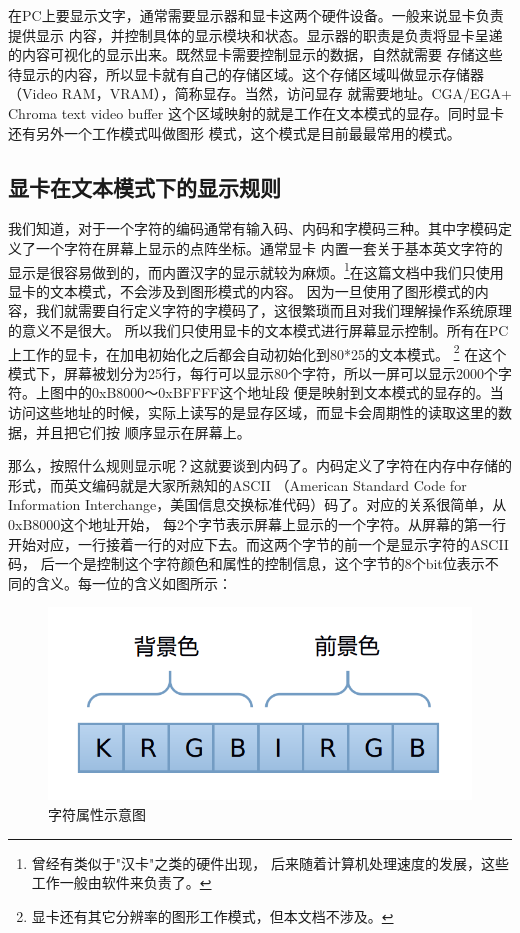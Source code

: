\par 在PC上要显示文字，通常需要显示器和显卡这两个硬件设备。一般来说显卡负责提供显示\allowbreak
内容，并控制具体的显示模块和状态。显示器的职责是负责将显卡呈递的内容可视化的显示出来。既然显卡需要控制显示的数据，自然就需要\allowbreak
存储这些待显示的内容，所以显卡就有自己的存储区域。这个存储区域叫做显示存储器（Video RAM，VRAM），简称显存。当然，访问显存\allowbreak
就需要地址。CGA/EGA+ Chroma text video buffer 这个区域映射的就是工作在文本模式的显存。同时显卡还有另外一个工作模式叫做图形\allowbreak
模式，这个模式是目前最最常用的模式。

\subsection{显卡在文本模式下的显示规则}

\par 我们知道，对于一个字符的编码通常有输入码、内码和字模码三种。其中字模码定义了一个字符在屏幕上显示的点阵坐标。通常显卡\allowbreak
内置一套关于基本英文字符的显示是很容易做到的，而内置汉字的显示就较为麻烦。\footnote{曾经有类似于"汉卡"之类的硬件出现，\allowbreak
后来随着计算机处理速度的发展，这些工作一般由软件来负责了。}在这篇文档中我们只使用显卡的文本模式，不会涉及到图形模式的内容。\allowbreak
因为一旦使用了图形模式的内容，我们就需要自行定义字符的字模码了，这很繁琐而且对我们理解操作系统原理的意义不是很大。\allowbreak
所以我们只使用显卡的文本模式进行屏幕显示控制。所有在PC上工作的显卡，在加电初始化之后都会自动初始化到80*25的文本模式。\allowbreak
\footnote{显卡还有其它分辨率的图形工作模式，但本文档不涉及。}\allowbreak
在这个模式下，屏幕被划分为25行，每行可以显示80个字符，所以一屏可以显示2000个字符。上图中的0xB8000～0xBFFFF这个地址段\allowbreak
便是映射到文本模式的显存的。当访问这些地址的时候，实际上读写的是显存区域，而显卡会周期性的读取这里的数据，并且把它们按\allowbreak
顺序显示在屏幕上。

\par 那么，按照什么规则显示呢？这就要谈到内码了。内码定义了字符在内存中存储的形式，而英文编码就是大家所熟知的ASCII\allowbreak
（American Standard Code for Information Interchange，美国信息交换标准代码）码了。对应的关系很简单，从0xB8000这个地址开始，\allowbreak
每2个字节表示屏幕上显示的一个字符。从屏幕的第一行开始对应，一行接着一行的对应下去。而这两个字节的前一个是显示字符的ASCII码，\allowbreak
后一个是控制这个字符颜色和属性的控制信息，这个字节的8个bit位表示不同的含义。每一位的含义如图所示：

\begin{figure}[H]
      \centering
      \includegraphics[scale=0.25]{picture/chapt4/char_color.png}
      \caption{字符属性示意图}
\end{figure}

